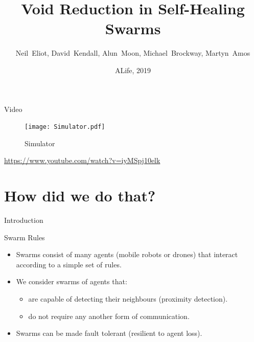 \documentclass{beamer}
\title{Void Reduction in Self-Healing Swarms}
\author[N.~Eliot et al.]{Neil~Eliot\inst{1}, David~Kendall\inst{1}, Alun~Moon\inst{1}, Michael~Brockway\inst{1}, Martyn~Amos\inst{1}}
\institute[Northumbria University] %
{
  \inst{1}
  Department of Computer and Information Sciences\\
  University of Northumbria
}
\date{ALife, 2019}
\begin{document}
\begin{frame}
  \titlepage
\end{frame}

\begin{frame}{Video}
  \begin{center}
    \begin{figure}
      \begin{center}
        \texttt{[image: Simulator.pdf]}
      \end{center}
      \caption{Simulator}
    \end{figure}
    \href{https://www.youtube.com/watch?v=iyMSpj10elk}{https://www.youtube.com/watch?v=iyMSpj10elk}
  \end{center}
\end{frame}  
\section{How did we do that?
}
\begin{frame}{Introduction}
  \tableofcontents
\end{frame}



\begin{frame}{Swarm Rules}
  \begin{itemize}
  \item {
    Swarms consist of many agents (mobile robots or drones) that interact according to a simple set of rules.
  }
  \item {
    We consider swarms of agents that:
    \begin{itemize}
      \item are capable of detecting their neighbours (proximity detection). 
      \item do not require any another form of communication. 
    \end{itemize}
  }
  \item {
    Swarms can be made fault tolerant (resilient to agent loss).
  }
  \end{itemize}
\end{frame}
\end{document}

